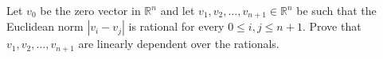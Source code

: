 \documentclass{article}
\begin{document}
\setlength{\parindent}{0pt}
Let $v_{0}$ be the zero vector in $\mathbb{R}^{n}$ and let $v_{1},v_{2},\dots,v_{n+1}\in\mathbb{R}^{n}$ be such that the Euclidean norm $|v_{i}-v_{j}|$ is rational for every $0\le i,j\le n+1$. Prove that $v_{1},v_{2},\dots,v_{n+1}$ are linearly dependent over the rationals.
\end{document}
